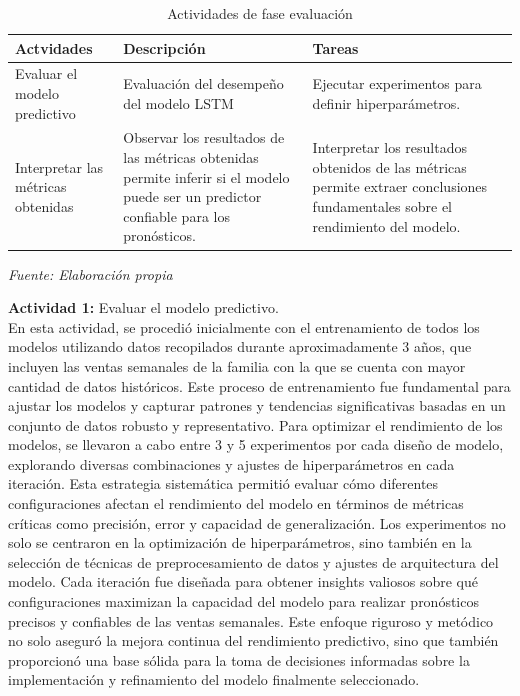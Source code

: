 		\begin{table}[H]
			\centering
			\caption{Actividades de fase evaluación}
			\begin{tabular}{L{3cm}|L{5cm}|L{5cm}}
				
				Actvidades & Descripción & Tareas \\
				\hline \hline
				Evaluar el modelo predictivo & Evaluación del desempeño del modelo LSTM   & Ejecutar experimentos para definir hiperparámetros.		
				\\
				\hline
				Interpretar las métricas obtenidas & Observar los resultados de las métricas obtenidas permite inferir si el modelo puede ser un predictor confiable para los pronósticos. & Interpretar los resultados obtenidos de las métricas permite extraer conclusiones fundamentales sobre el rendimiento del modelo.
				\\
				\hline		
			\end{tabular}
			\newline
			\newline \textit{Fuente: Elaboración propia}
			\label{tab:act_eva}
		\end{table}
		
		\textbf{Actividad 1:} Evaluar el modelo predictivo.\\
		En esta actividad, se procedió inicialmente con el entrenamiento de todos los modelos utilizando datos recopilados durante aproximadamente 3 años, que incluyen las ventas semanales de la familia con la que se cuenta con mayor cantidad de datos históricos. Este proceso de entrenamiento fue fundamental para ajustar los modelos y capturar patrones y tendencias significativas basadas en un conjunto de datos robusto y representativo.
		Para optimizar el rendimiento de los modelos, se llevaron a cabo entre 3 y 5 experimentos por cada diseño de modelo, explorando diversas combinaciones y ajustes de hiperparámetros en cada iteración. Esta estrategia sistemática permitió evaluar cómo diferentes configuraciones afectan el rendimiento del modelo en términos de métricas críticas como precisión, error y capacidad de generalización.
		Los experimentos no solo se centraron en la optimización de hiperparámetros, sino también en la selección de técnicas de preprocesamiento de datos y ajustes de arquitectura del modelo. Cada iteración fue diseñada para obtener insights valiosos sobre qué configuraciones maximizan la capacidad del modelo para realizar pronósticos precisos y confiables de las ventas semanales.
		Este enfoque riguroso y metódico no solo aseguró la mejora continua del rendimiento predictivo, sino que también proporcionó una base sólida para la toma de decisiones informadas sobre la implementación y refinamiento del modelo finalmente seleccionado.\\
		
